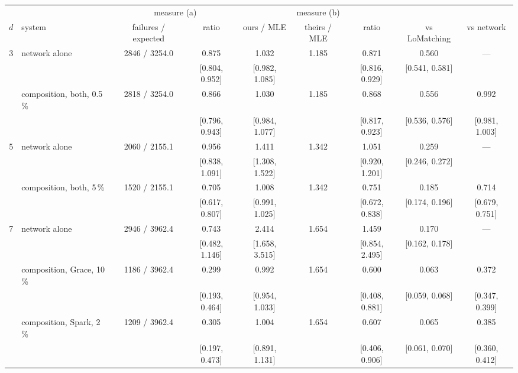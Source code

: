\begin{tabular}{@{}clccccccc@{}}
\toprule
& & \multicolumn{2}{c}{measure (a)} & \multicolumn{3}{c}{measure (b)} & & \\
\cmidrule(lr){3-4}\cmidrule(lr){5-7}
$d$ & system & failures / expected & ratio & ours / MLE & theirs / MLE & ratio & vs LoMatching & vs network \\
\midrule
3 & network alone & 2846 / 3254.0 & 0.875 & 1.032 & 1.185 & 0.871 & 0.560 & --- \\
 &  &  & {\tiny[0.804, 0.952]} & {\tiny[0.982, 1.085]} &  & {\tiny[0.816, 0.929]} & {\tiny[0.541, 0.581]} &  \\
 & composition, both, 0.5\,\% & 2818 / 3254.0 & 0.866 & 1.030 & 1.185 & 0.868 & 0.556 & 0.992 \\
 &  &  & {\tiny[0.796, 0.943]} & {\tiny[0.984, 1.077]} &  & {\tiny[0.817, 0.923]} & {\tiny[0.536, 0.576]} & {\tiny[0.981, 1.003]} \\
\midrule
5 & network alone & 2060 / 2155.1 & 0.956 & 1.411 & 1.342 & 1.051 & 0.259 & --- \\
 &  &  & {\tiny[0.838, 1.091]} & {\tiny[1.308, 1.522]} &  & {\tiny[0.920, 1.201]} & {\tiny[0.246, 0.272]} &  \\
 & composition, both, 5\,\% & 1520 / 2155.1 & 0.705 & 1.008 & 1.342 & 0.751 & 0.185 & 0.714 \\
 &  &  & {\tiny[0.617, 0.807]} & {\tiny[0.991, 1.025]} &  & {\tiny[0.672, 0.838]} & {\tiny[0.174, 0.196]} & {\tiny[0.679, 0.751]} \\
\midrule
7 & network alone & 2946 / 3962.4 & 0.743 & 2.414 & 1.654 & 1.459 & 0.170 & --- \\
 &  &  & {\tiny[0.482, 1.146]} & {\tiny[1.658, 3.515]} &  & {\tiny[0.854, 2.495]} & {\tiny[0.162, 0.178]} &  \\
 & composition, Grace, 10\,\% & 1186 / 3962.4 & 0.299 & 0.992 & 1.654 & 0.600 & 0.063 & 0.372 \\
 &  &  & {\tiny[0.193, 0.464]} & {\tiny[0.954, 1.033]} &  & {\tiny[0.408, 0.881]} & {\tiny[0.059, 0.068]} & {\tiny[0.347, 0.399]} \\
 & composition, Spark, 2\,\% & 1209 / 3962.4 & 0.305 & 1.004 & 1.654 & 0.607 & 0.065 & 0.385 \\
 &  &  & {\tiny[0.197, 0.473]} & {\tiny[0.891, 1.131]} &  & {\tiny[0.406, 0.906]} & {\tiny[0.061, 0.070]} & {\tiny[0.360, 0.412]} \\
\bottomrule
\end{tabular}
